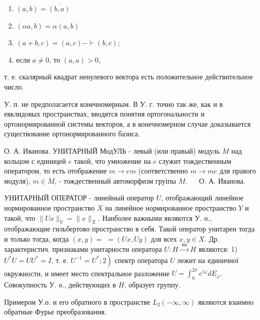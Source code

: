 \documentclass[10pt]{article}
\begin{document}
\begin{enumerate}

  \item $(a, b)=\overline{(b, a)}$



  \item $(\alpha a, b)=\alpha(a, b)$



  \item $(a+b, c)=(a, c)-\vdash(b, c)$;



  \item если $a \neq 0$, то $(a, a)>0$,



\end{enumerate}



т. е. скалярный квадрат ненулевого вектора есть положительное действительное число.



У. п. не предполагается конечномерным. В У. г. точно так же, как и в евклидовых пространствах, вводятся понятия ортогональности и ортонормированной системы векторов, а в конечномерном случае доказывается существование ортонормированного базиса.



О. А. Иванова. УНИТАРНЫЙ МодУЛЬ - левый (или правый) модуль $M$ над кольцом с единицей $e$ такой, что умножение на $e$ служит тождественным оператором, то есть отображение $m \rightarrow e m$ (соответственно $m \rightarrow m e$ для правого модуля), $m \in M$, - тождественный автоморфизм груіпы $M$. $\quad$ О. А. Иванова.



УНИТАРНЫЙ ОПЕРАТОР - линейный оператор $U$, отображающий линейное нормированное пространство $X$ на линейное нормированное пространство $Y$ и такой, что $\|U x\|_{Y}=\|x\|_{X}$. Наиболее важными являются У. о., отображающие гильбертово пространство в себя. Такой оператор унитарен тогда и только тогда, когда $(x, y)=$ $=(U x, U y)$ для всех $x, y \in X$. Др. характеристич. признаками унитарности оператора $U: H \stackrel{\text { на }}{\rightarrow} H$ являются: 1) $U^{*} U=U U^{*}=I$, т. е. $\left.U^{-1}=U^{*} ; 2\right)$ спектр оператора $U$ лежит на единичної окружности, и имеет место спектральное разложение $U=\int_{0}^{2 \pi} e^{i \varphi} d E_{\varphi}$. Совокупность У. о., действующих в $H$, образует группу.



Примером У.о. и его обратного в пространстве $L_{2}(-\infty, \infty)$ являются взаимно обратные Фурье преобразования.
\end{document}
